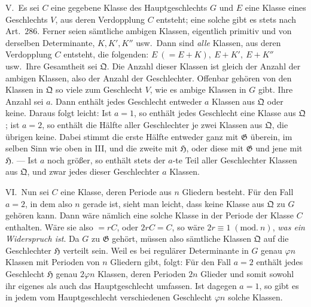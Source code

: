 V.\ Es sei \(C\) eine gegebene Klasse des Hauptgeschlechts \(G\) und \(E\) eine Klasse eines Geschlechts \(V\), aus deren Verdopplung \(C\) entsteht; eine solche gibt es stets nach Art.\ \(286\). Ferner seien sämtliche ambigen Klassen, eigentlich primitiv und von derselben Determinante, \(K,K',K''\) usw.\ Dann sind \textit{alle} Klassen, aus deren
Verdopplung \(C\) entsteht, die folgenden: \(E\ (=E+K),\ E+K',\ E+K''\) usw.\ Ihre Gesamtheit sei \(\mathfrak Q\). Die Anzahl dieser Klassen ist gleich der Anzahl der ambigen Klassen, also der Anzahl der Geschlechter. Offenbar gehören von den Klassen in \(\mathfrak Q\) so viele zum Geschlecht \(V\), wie es ambige Klassen in \(G\) gibt. Ihre Anzahl sei \(a\). Dann enthält jedes Geschlecht entweder \(a\) Klassen aus \(\mathfrak Q\) oder keine. Daraus folgt leicht: Ist \(a=1\), so enthält jedes Geschlecht eine Klasse aus \(\mathfrak Q\); ist \(a=2\), so enthält die Hälfte aller Geschlechter je zwei Klassen aus \(\mathfrak Q\), die übrigen keine. Dabei stimmt die erste Hälfte entweder ganz mit \(\mathfrak G\) überein, im selben Sinn wie oben in III, und die zweite mit \(\mathfrak H\), oder diese mit \(\mathfrak G\) und jene mit \(\mathfrak H\). — Ist \(a\) noch größer, so enthält stets der \(a\)-te Teil aller Geschlechter Klassen aus \(\mathfrak Q\), und zwar jedes dieser Geschlechter \(a\) Klassen.

VI.\ Nun sei \(C\) eine Klasse, deren Periode aus \(n\) Gliedern besteht. Für den Fall \(a=2\), in dem also \(n\) gerade ist, sieht man leicht, dass keine Klasse aus \(\mathfrak Q\) zu \(G\) gehören kann. Dann wäre nämlich eine solche Klasse in der Periode der Klasse \(C\) enthalten. Wäre sie also \(=rC\), oder \(2rC=C\), so wäre \(2r\equiv1\; (\mathrm{mod}.\ n)\), \textit{was ein Widerspruch ist}. Da \(G\) zu \(\mathfrak G\) gehört, müssen also sämtliche Klassen \(\mathfrak Q\) auf die Geschlechter \(\mathfrak H\) verteilt sein. Weil es bei regulärer Determinante in \(G\) genau \(\varphi n\) Klassen mit Perioden von \(n\) Gliedern gibt, folgt: Für den Fall \(a=2\) enthält jedes Geschlecht \(\mathfrak H\) genau \(2\varphi n\) Klassen, deren Perioden \(2n\) Glieder und somit sowohl ihr eigenes als auch das Hauptgeschlecht umfassen. Ist dagegen \(a=1\), so gibt es in jedem vom Hauptgeschlecht verschiedenen Geschlecht \(\varphi n\) solche Klassen.

